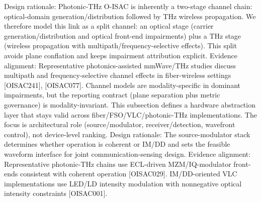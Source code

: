 {}Design rationale: Photonic-THz O-ISAC is inherently a two-stage channel chain: optical-domain generation/distribution followed by THz wireless propagation.\markdownRendererParagraphSeparator
{}We therefore model this link as a split channel: an optical stage (carrier generation/distribution and optical front-end impairments) plus a THz stage (wireless propagation with multipath/frequency-selective effects). This split avoids plane conflation and keeps impairment attribution explicit.\markdownRendererParagraphSeparator
{}Evidence alignment: Representative photonics-assisted mmWave/THz studies discuss multipath and frequency-selective channel effects in fiber-wireless settings [O\markdownRendererUnderscore{}ISAC\markdownRendererUnderscore{}241], [O\markdownRendererUnderscore{}ISAC\markdownRendererUnderscore{}077].\markdownRendererParagraphSeparator
{} Channel models are modality-specific in dominant impairments, but the reporting contract (plane separation plus metric governance) is modality-invariant.\markdownRendererInterblockSeparator
{}\markdownRendererThematicBreak{}\markdownRendererInterblockSeparator
{}
\markdownRendererSectionEnd 
\markdownRendererSectionEnd \markdownRendererSectionBegin
{}\markdownRendererInterblockSeparator
{}This subsection defines a hardware abstraction layer that stays valid across fiber/FSO/VLC/photonic-THz implementations. The focus is architectural role (source/modulator, receiver/detection, wavefront control), not device-level ranking.\markdownRendererInterblockSeparator
{}\markdownRendererSectionBegin
{}\markdownRendererInterblockSeparator
{}Design rationale: The source-modulator stack determines whether operation is coherent or IM/DD and sets the feasible waveform interface for joint communication-sensing design.\markdownRendererParagraphSeparator
{}Evidence alignment: Representative photonic-THz chains use ECL-driven MZM/IQ-modulator front-ends consistent with coherent operation [O\markdownRendererUnderscore{}ISAC\markdownRendererUnderscore{}029]. IM/DD-oriented VLC implementations use LED/LD intensity modulation with nonnegative optical intensity constraints [O\markdownRendererUnderscore{}ISAC\markdownRendererUnderscore{}001].\markdownRendererInterblockSeparator
{}
\markdownRendererSectionEnd \markdownRendererSectionBegin
{}\markdownRendererInterblockSeparator
